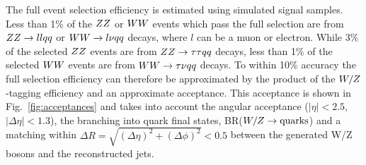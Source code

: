
The full event selection efficiency is estimated using simulated
signal samples.
Less than 1\% of the $ZZ$ or $WW$ events which pass the full
selection are from $ZZ \to ll qq$ or $WW \to l\nu qq$
decays, where $l$ can be a muon or electron.  While 3\% of the
selected $ZZ$ events are from $ZZ \to \tau\tau qq$ decays,
less than 1\% of the selected $WW$ events are from $WW \to
\tau\nu qq$ decays.
To within 10\% accuracy the full selection efficiency can
therefore be
approximated by the product of the $W/Z$-tagging efficiency
and an approximate acceptance.
This acceptance is shown in Fig.~\ref{fig:acceptances} and
takes into account the angular acceptance
($|\eta| < 2.5$, $|\Delta\eta|<1.3$),
the branching into quark final states,
BR($W/Z \to \text{quarks}$) and a matching within
$\Delta R = \sqrt{(\Delta \eta)^2 + (\Delta\phi)^2} <0.5$
between the generated W/Z bosons and the reconstructed jets.


